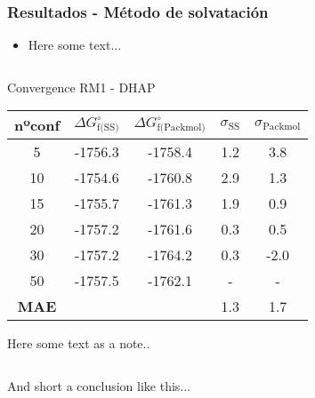 \documentclass[aspectratio=169, hyperref={pdfpagelabels=false}]{beamer}
\begin{document}
\begin{frame}
\frametitle{Resultados - Método de solvatación}

\begin{itemize}
\item Here some text...
\end{itemize}

\begin{columns}[onlytextwidth]
    \begin{column}{.65\textwidth}
        \begin{threeparttable}
            \caption{Convergence RM1 - DHAP}
            \begin{tabular}{ccccc}\toprule
                nºconf & $\Delta G^\circ_{\text{f(SS)}}$ & $\Delta G^\circ_{\text{f(Packmol)}}$ & $\sigma_{\text{SS}}$ & $\sigma_{\text{Packmol}}$ \\  \midrule
                5 & -1756.3 & -1758.4 & 1.2 & 3.8 \\  
                10 & -1754.6 & -1760.8 & 2.9 & 1.3 \\  
                15 & -1755.7 & -1761.3 & 1.9 & 0.9 \\  
                20 & -1757.2 & -1761.6 & 0.3 & 0.5 \\  
                30 & -1757.2 & -1764.2 & 0.3 & -2.0 \\  
                50 & -1757.5 & -1762.1 & - & - \\ 
                \textbf{MAE} &  &  & 1.3 & 1.7 \\ \bottomrule
            \end{tabular}
            \begin{tablenotes}
                \footnotesize
                \item{Here some text as a note..}
            \end{tablenotes}
        \end{threeparttable}
    \end{column}
    \begin{column}{.3\textwidth}
    \end{column}
\end{columns}

\begin{center}
    And short a conclusion like this...
\end{center}

\end{frame}
\end{document}
